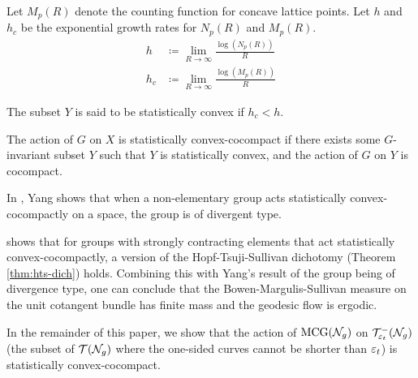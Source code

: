 Let $M_p(R)$ denote the counting function for concave lattice points.
Let $h$ and $h_c$ be the exponential growth rates for $N_p(R)$ and $M_p(R)$.
\begin{align*}
  h &\coloneqq \lim_{R \to \infty} \frac{\log\left( N_p(R) \right)}{R} \\
  h_c &\coloneqq \lim_{R \to \infty} \frac{\log\left( M_p(R) \right)}{R}
\end{align*}

\begin{definition}
  \label{defn:statistical-convex-subset}
  The subset $Y$ is said to be statistically convex if $h_c < h$.
\end{definition}

\begin{definition}
  The action of $G$ on $X$ is statistically convex-cocompact if there exists some $G$-invariant subset $Y$ such that $Y$ is statistically convex, and the action of $G$ on $Y$ is cocompact.
\end{definition}

In \cite{10.1093/imrn/rny001}, Yang shows that when a non-elementary group acts statistically convex-cocompactly on a space, the group is of divergent type.

\textcite{coulon2024ergodicity} shows that for groups with strongly contracting elements that act statistically convex-cocompactly, a version of the Hopf-Tsuji-Sullivan dichotomy (Theorem \ref{thm:hts-dich}) holds.
Combining this with Yang's result of the group being of divergence type, one can conclude that the Bowen-Margulis-Sullivan measure on the unit cotangent bundle has finite mass and the geodesic flow is ergodic.


In the remainder of this paper, we show that the action of $\mathrm{MCG}(\mathcal{N}_g)$ on $\mathcal{T}_{\varepsilon_t}^{-}(\mathcal{N}_g)$ (the subset of $\mathcal{T}(\mathcal{N}_g)$ where the one-sided curves cannot be shorter than $\varepsilon_t$) is statistically convex-cocompact.


